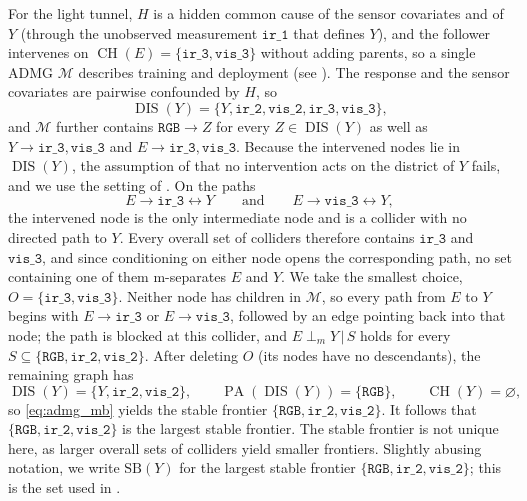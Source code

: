 \documentclass{article}
\newcommand{\SB}{\mathrm{SB}}
\DeclareMathOperator{\CH}{CH}
\DeclareMathOperator{\PA}{PA}
\DeclareMathOperator{\DIS}{DIS}
\newcommand{\given}{\,|\,}
\newcommand{\msep}{\mathrel{\perp_{m}}}
\begin{document}
For the light tunnel, $H$ is a hidden common cause of the sensor covariates and of $Y$ (through the unobserved measurement $\mathtt{ir\_1}$ that defines $Y$), and the follower intervenes on $\CH(E) = \{\mathtt{ir\_3}, \mathtt{vis\_3}\}$ without adding parents, so a single ADMG $\mathcal{M}$ describes training and deployment (see ).
The response and the sensor covariates are pairwise confounded by $H$, so
\begin{equation*}
    \DIS(Y) = \{Y, \mathtt{ir\_2}, \mathtt{vis\_2}, \mathtt{ir\_3}, \mathtt{vis\_3}\},
\end{equation*}
and $\mathcal{M}$ further contains $\mathtt{RGB} \to Z$ for every $Z \in \DIS(Y)$ as well as $Y \to \mathtt{ir\_3}, \mathtt{vis\_3}$ and $E \to \mathtt{ir\_3}, \mathtt{vis\_3}$.
Because the intervened nodes lie in $\DIS(Y)$, the assumption of \citet[Section~3]{xiangStableBlanketHidden2026} that no intervention acts on the district of $Y$ fails, and we use the setting of \citet[Section~6]{xiangStableBlanketHidden2026}.
On the paths
\begin{equation*}
    E \to \mathtt{ir\_3} \leftrightarrow Y \qquad \text{and} \qquad E \to \mathtt{vis\_3} \leftrightarrow Y,
\end{equation*}
the intervened node is the only intermediate node and is a collider with no directed path to $Y$.
Every overall set of colliders therefore contains $\mathtt{ir\_3}$ and $\mathtt{vis\_3}$, and since conditioning on either node opens the corresponding path, no set containing one of them m-separates $E$ and $Y$.
We take the smallest choice, $O = \{\mathtt{ir\_3}, \mathtt{vis\_3}\}$.
Neither node has children in $\mathcal{M}$, so every path from $E$ to $Y$ begins with $E \to \mathtt{ir\_3}$ or $E \to \mathtt{vis\_3}$, followed by an edge pointing back into that node; the path is blocked at this collider, and $E \msep Y \given S$ holds for every $S \subseteq \{\mathtt{RGB}, \mathtt{ir\_2}, \mathtt{vis\_2}\}$.
After deleting $O$ (its nodes have no descendants), the remaining graph has
\begin{equation*}
    \DIS(Y) = \{Y, \mathtt{ir\_2}, \mathtt{vis\_2}\}, \qquad \PA(\DIS(Y)) = \{\mathtt{RGB}\}, \qquad \CH(Y) = \varnothing,
\end{equation*}
so \eqref{eq:admg_mb} yields the stable frontier
$\{\mathtt{RGB}, \mathtt{ir\_2}, \mathtt{vis\_2}\}$.
It follows that $\{\mathtt{RGB}, \mathtt{ir\_2}, \mathtt{vis\_2}\}$ is the largest stable frontier. The stable frontier is not unique here, as larger overall sets of colliders yield smaller frontiers. Slightly abusing notation, we write $\SB(Y)$ for the largest stable frontier $\{\mathtt{RGB}, \mathtt{ir\_2}, \mathtt{vis\_2}\}$; this is the set used in .
\end{document}
